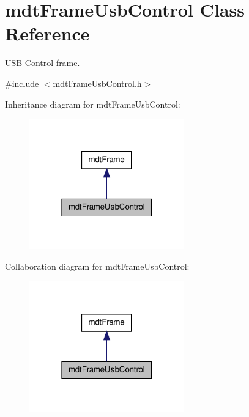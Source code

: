 \hypertarget{classmdt_frame_usb_control}{
\section{mdtFrameUsbControl Class Reference}
\label{classmdt_frame_usb_control}
}


USB Control frame.  




{\ttfamily \#include $<$mdtFrameUsbControl.h$>$}



Inheritance diagram for mdtFrameUsbControl:\nopagebreak
\begin{figure}[H]
\begin{center}
\leavevmode
\includegraphics[width=190pt]{classmdt_frame_usb_control__inherit__graph}
\end{center}
\end{figure}


Collaboration diagram for mdtFrameUsbControl:\nopagebreak
\begin{figure}[H]
\begin{center}
\leavevmode
\includegraphics[width=190pt]{classmdt_frame_usb_control__coll__graph}
\end{center}
\end{figure}
